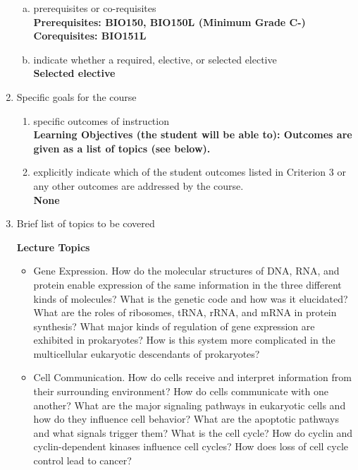 \begin{enumerate}[1.]
\begin{enumerate}[a.]
\item prerequisites or co-requisites\\
  {\bfseries
    Prerequisites: BIO150, BIO150L (Minimum Grade C-)\\    
    Corequisites: BIO151L
  }

\item indicate whether a required, elective, or selected elective\\ %
  {\bfseries
    Selected elective
  }

\end{enumerate}

\item Specific goals for the course
\begin{enumerate}
\item specific outcomes of instruction\\ %
  {\bfseries
    Learning Objectives (the student will be able to):
    Outcomes are given as a list of topics (see below).
  }

\item explicitly indicate which of the student outcomes listed in Criterion 3 or any other outcomes are addressed by the course.\\
  {\bfseries
    None
  }
\end{enumerate}

\item Brief list of topics to be covered\\
  {\bfseries
    Lecture Topics
    \begin{itemize}
    \item Gene Expression. 
How do the molecular structures of DNA, RNA, and protein enable expression of the same information in the three different kinds of molecules? What is the genetic code and how was it elucidated? What are the roles of ribosomes, tRNA, rRNA, and mRNA in protein synthesis?  What major kinds of regulation of gene expression are exhibited in prokaryotes? How is this system more complicated in the multicellular eukaryotic descendants of prokaryotes? 
    \item Cell Communication.
How do cells receive and interpret information from their surrounding environment?  How do cells communicate with one another? What are the major signaling pathways in eukaryotic cells and how do they influence cell behavior?  What are the apoptotic pathways and what signals trigger them? What is the cell cycle?  How do cyclin and cyclin-dependent kinases influence cell cycles? How does loss of cell cycle control lead to cancer? 


\end{itemize}}
\end{enumerate}
